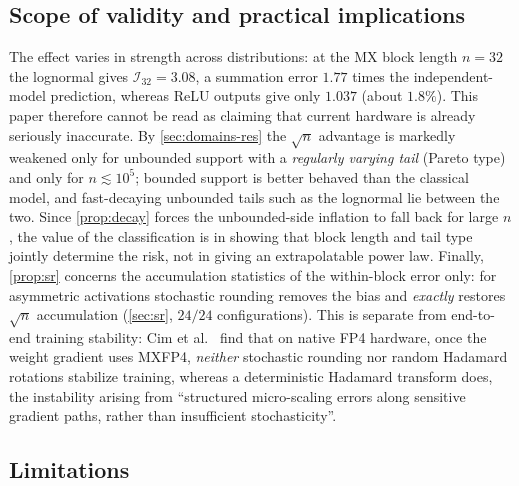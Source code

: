 \documentclass[twocolumn,review,hidelinks,oneeqnum,onetabnum,onefignum,onethmnum]{siamart251216}
\begin{document}
\subsection{Scope of validity and practical implications}

The effect varies in strength across distributions: at the MX block length $n=32$
the lognormal gives $\mathcal I_{32}=3.08$, a summation error $1.77$ times the
independent-model prediction, whereas ReLU outputs give only $1.037$ (about
$1.8\%$). This paper therefore cannot be read as claiming that current hardware is
already seriously inaccurate. By \cref{sec:domains-res} the $\sqrt n$ advantage is
markedly weakened only for unbounded support with a \emph{regularly varying tail}
(Pareto type) and only for $n\lesssim10^5$; bounded support is better behaved than
the classical model, and fast-decaying unbounded tails such as the lognormal lie
between the two. Since \cref{prop:decay} forces the unbounded-side inflation to
fall back for large $n$, the value of the classification is in showing that block
length and tail type jointly determine the risk, not in giving an extrapolatable
power law. Finally, \cref{prop:sr} concerns the accumulation statistics of the
within-block error only: for asymmetric activations stochastic rounding removes the
bias and \emph{exactly} restores $\sqrt n$ accumulation (\cref{sec:sr}, $24/24$
configurations). This is separate from end-to-end training stability: Cim et
al.\ \cite{cim2026mxfp4} find that on native FP4 hardware, once the weight gradient
uses MXFP4, \emph{neither} stochastic rounding nor random Hadamard rotations
stabilize training, whereas a deterministic Hadamard transform does, the
instability arising from ``structured micro-scaling errors along sensitive gradient
paths, rather than insufficient stochasticity''.

\subsection{Limitations}
\label{sec:limitations}
\end{document}

